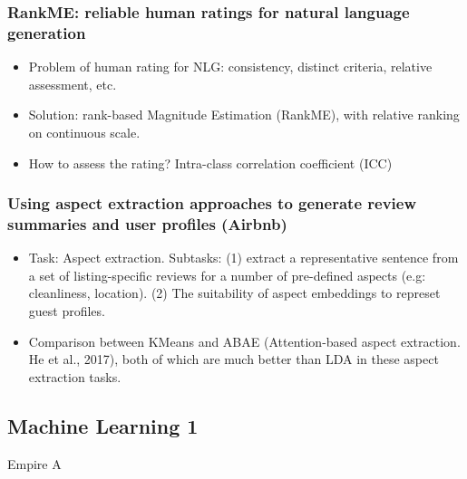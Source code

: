 \subsubsection{\cite{Novikova2018RankME:} RankME: reliable human ratings for natural language generation}
\begin{itemize}
	\item Problem of human rating for NLG: consistency, distinct criteria, relative assessment, etc.
	\item Solution: rank-based Magnitude Estimation (RankME), with relative ranking on continuous scale.
	\item How to assess the rating? Intra-class correlation coefficient (ICC)
\end{itemize}


\subsubsection{\cite{Mitcheltree2018Using} Using aspect extraction approaches to generate review summaries and user profiles (Airbnb)}
\begin{itemize}
	\item Task: Aspect extraction. Subtasks: (1) extract a representative sentence from a set of listing-specific reviews for a number of pre-defined aspects (e.g: cleanliness, location). (2) The suitability of aspect embeddings to represet guest profiles.
	\item Comparison between KMeans and ABAE (Attention-based aspect extraction. He et al., 2017), both of which are much better than LDA in these aspect extraction tasks.
\end{itemize}


\subsection{Machine Learning 1}
Empire A


